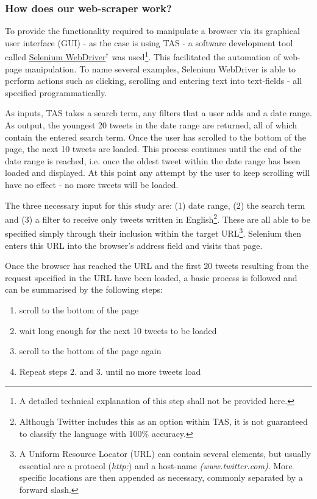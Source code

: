 \documentclass{article}
\begin{document}
\subsubsection{How does our web-scraper work?}
\label{sec-1-3-2}

To provide the functionality required to manipulate a browser via its graphical user interface (GUI) - as the case is using TAS - a software development tool called \href{http://docs.seleniumhq.org/}{Selenium WebDriver$^{\dag{}}$} was used\footnote{A detailed technical explanation of this step shall not be provided here.}. This facilitated the automation of web-page manipulation. To name several examples, Selenium WebDriver is able to perform actions such as clicking, scrolling and entering text into text-fields - all specified programmatically.

As inputs, TAS takes a search term, any filters that a user adds and a date range. As output, the youngest 20 tweets in the date range are returned, all of which contain the entered search term. Once the user has scrolled to the bottom of the page, the next 10 tweets are loaded. This process continues until the end of the date range is reached, i.e. \hspace{-6pt} once the oldest tweet within the date range has been loaded and displayed. At this point any attempt by the user to keep scrolling will have no effect - no more tweets will be loaded.

The three necessary input for this study are: (1) date range, (2) the search term and (3) a filter to receive only tweets written in English\footnote{Although Twitter includes this as an option within TAS, it is not guaranteed to classify the language with 100\% accuracy.}. These are all able to be specified simply through their inclusion within the target URL\footnote{A Uniform Resource Locator (URL) can contain several elements, but usually essential are a protocol (\emph{http:}) and a host-name \emph{(www.twitter.com)}. More specific locations are then appended as necessary, commonly separated by a forward slash.}. Selenium then enters this URL into the browser's address field and visits that page.

Once the browser has reached the URL and the first 20 tweets resulting from the request specified in the URL have been loaded, a basic process is followed and can be summarised by the following steps:

\begin{enumerate}
\item scroll to the bottom of the page
\item wait long enough for the next 10 tweets to be loaded
\item scroll to the bottom of the page again
\item Repeat steps 2. and 3. until no more tweets load
\end{enumerate}
\end{document}
